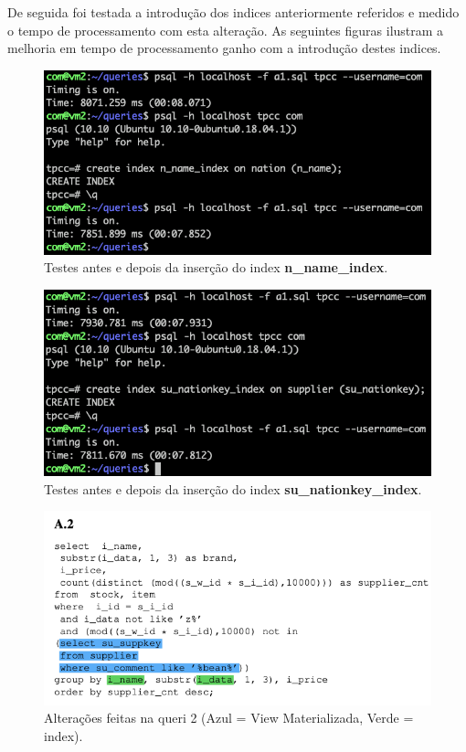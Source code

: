 \hspace{5mm} De seguida foi testada a introdução dos indices anteriormente referidos e medido o tempo de processamento com esta alteração. As seguintes figuras ilustram a melhoria em tempo de processamento ganho com a introdução destes indices.

\begin{figure}[H]
    \centering
    \includegraphics[scale=0.5]{imagens/q1_index_1.png}
    \caption{Testes antes e depois da inserção do index \textbf{n\_name_index}.}
    \label{fig:exemplo}
\end{figure}

\begin{figure}[H]
    \centering
    \includegraphics[scale=0.5]{imagens/q1_index_2.png}
    \caption{Testes antes e depois da inserção do index \textbf{su\_nationkey\_index}.}
    \label{fig:exemplo}
\end{figure}

\begin{figure}[H]
    \centering
    \includegraphics[scale=0.5]{imagens/a2.png}
    \caption{Alterações feitas na queri 2 (Azul = View Materializada, Verde = index).}
    \label{fig:exemplo}
\end{figure}

